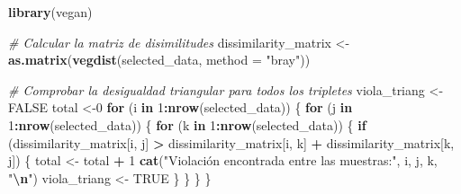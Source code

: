 \documentclass[
]{article}
\newenvironment{Shaded}{\begin{snugshade}}{\end{snugshade}}
\newcommand{\AttributeTok}[1]{\textcolor[rgb]{0.13,0.29,0.53}{#1}}
\newcommand{\CommentTok}[1]{\textcolor[rgb]{0.56,0.35,0.01}{\textit{#1}}}
\newcommand{\ConstantTok}[1]{\textcolor[rgb]{0.56,0.35,0.01}{#1}}
\newcommand{\ControlFlowTok}[1]{\textcolor[rgb]{0.13,0.29,0.53}{\textbf{#1}}}
\newcommand{\DecValTok}[1]{\textcolor[rgb]{0.00,0.00,0.81}{#1}}
\newcommand{\FunctionTok}[1]{\textcolor[rgb]{0.13,0.29,0.53}{\textbf{#1}}}
\newcommand{\NormalTok}[1]{#1}
\newcommand{\OtherTok}[1]{\textcolor[rgb]{0.56,0.35,0.01}{#1}}
\newcommand{\SpecialCharTok}[1]{\textcolor[rgb]{0.81,0.36,0.00}{\textbf{#1}}}
\newcommand{\StringTok}[1]{\textcolor[rgb]{0.31,0.60,0.02}{#1}}
\begin{document}
\begin{Shaded}
\begin{Highlighting}[]
\FunctionTok{library}\NormalTok{(vegan)}

\CommentTok{\# Calcular la matriz de disimilitudes}
\NormalTok{dissimilarity\_matrix }\OtherTok{\textless{}{-}} \FunctionTok{as.matrix}\NormalTok{(}\FunctionTok{vegdist}\NormalTok{(selected\_data, }\AttributeTok{method =} \StringTok{"bray"}\NormalTok{))}

\CommentTok{\# Comprobar la desigualdad triangular para todos los tripletes}
\NormalTok{viola\_triang }\OtherTok{\textless{}{-}} \ConstantTok{FALSE}
\NormalTok{total }\OtherTok{\textless{}{-}}\DecValTok{0}
\ControlFlowTok{for}\NormalTok{ (i }\ControlFlowTok{in} \DecValTok{1}\SpecialCharTok{:}\FunctionTok{nrow}\NormalTok{(selected\_data)) \{}
  \ControlFlowTok{for}\NormalTok{ (j }\ControlFlowTok{in} \DecValTok{1}\SpecialCharTok{:}\FunctionTok{nrow}\NormalTok{(selected\_data)) \{}
    \ControlFlowTok{for}\NormalTok{ (k }\ControlFlowTok{in} \DecValTok{1}\SpecialCharTok{:}\FunctionTok{nrow}\NormalTok{(selected\_data)) \{}
      \ControlFlowTok{if}\NormalTok{ (dissimilarity\_matrix[i, j] }\SpecialCharTok{\textgreater{}}\NormalTok{ dissimilarity\_matrix[i, k] }\SpecialCharTok{+}\NormalTok{ dissimilarity\_matrix[k, j]) \{}
\NormalTok{        total }\OtherTok{\textless{}{-}}\NormalTok{ total }\SpecialCharTok{+} \DecValTok{1}
        \FunctionTok{cat}\NormalTok{(}\StringTok{"Violación encontrada entre las muestras:"}\NormalTok{, i, j, k, }\StringTok{"}\SpecialCharTok{\textbackslash{}n}\StringTok{"}\NormalTok{)}
\NormalTok{        viola\_triang }\OtherTok{\textless{}{-}} \ConstantTok{TRUE}
\NormalTok{      \}}
\NormalTok{    \}}
\NormalTok{  \}}
\NormalTok{\}}
\end{Highlighting}
\end{Shaded}
\end{document}
